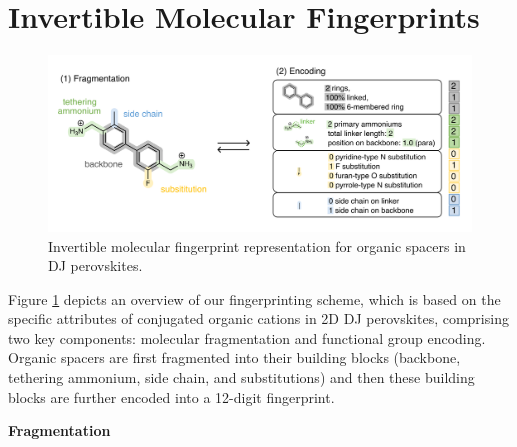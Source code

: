 \section{Invertible Molecular Fingerprints}\label{section:section3-2}

\begin{figure}[ht]
    \centering
    \includegraphics[width=\textwidth]{figures/methodology/figure3-3.png}
    \caption{Invertible molecular fingerprint representation for organic spacers in DJ perovskites.}
    \label{fig:figure3.3}
\end{figure}

Figure \ref{fig:figure3.3} depicts an overview of our fingerprinting scheme, which is based on the specific attributes of conjugated organic cations in 2D DJ perovskites, comprising two key components: molecular fragmentation and functional group encoding. Organic spacers are first fragmented into their building blocks (backbone, tethering ammonium, side chain, and substitutions) and then these building blocks are further encoded into a 12-digit fingerprint. 

\textbf{Fragmentation}

